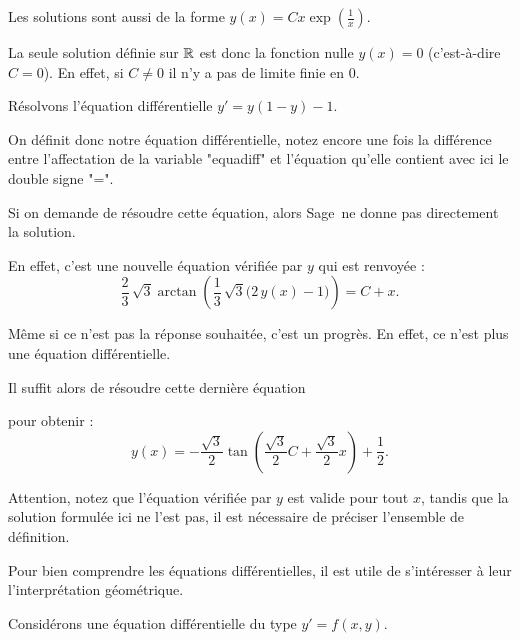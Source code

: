 \change
Les solutions sont aussi de la forme $y(x) = Cx \exp(\frac1x)$.

\change
    La seule solution définie sur $\mathbb{R}$ est donc la fonction nulle $y(x) = 0$ (c'est-à-dire $C=0$). 
    En effet, si $C \neq 0$ il n'y a pas de limite finie en $0$.
    
    
    
\diapo 

Résolvons l'équation différentielle $y'= y(1-y) - 1.$  

\change
On définit donc notre équation différentielle, notez encore une fois la différence entre l'affectation de la variable "equadiff" et l'équation qu'elle contient avec ici le double signe "=".

\change
Si on demande de résoudre cette équation, alors Sage\ ne donne pas directement la solution.

\change  
En effet, c'est une nouvelle équation vérifiée par $y$ qui est renvoyée : 
$$
  \frac{2}{3} \, \sqrt{3} \arctan\left(\frac{1}{3} \, \sqrt{3} {\big(2 \, y\left(x\right) - 1\big)}\right) = C + x.
$$
  
Même si ce n'est pas la réponse souhaitée, c'est un progrès. En effet, ce n'est plus une équation différentielle.

\change
Il suffit alors de résoudre cette dernière équation 

\change
pour obtenir :
$$  y\left(x\right) = -\frac{\sqrt{3}}{2} \tan\left(\frac{\sqrt{3}}{2} C + \frac{\sqrt{3}}{2}  x\right) + \frac{1}{2}.
$$
  
  

Attention, notez que l'équation vérifiée par $y$ est valide pour tout $x$, tandis que la solution formulée ici ne l'est pas, il est nécessaire de préciser l'ensemble de définition.

  
  



\diapo 


Pour bien comprendre les équations différentielles, il est utile de 
s'intéresser à leur l'interprétation géométrique.

Considérons une équation différentielle du type $y' = f(x,y)$.



